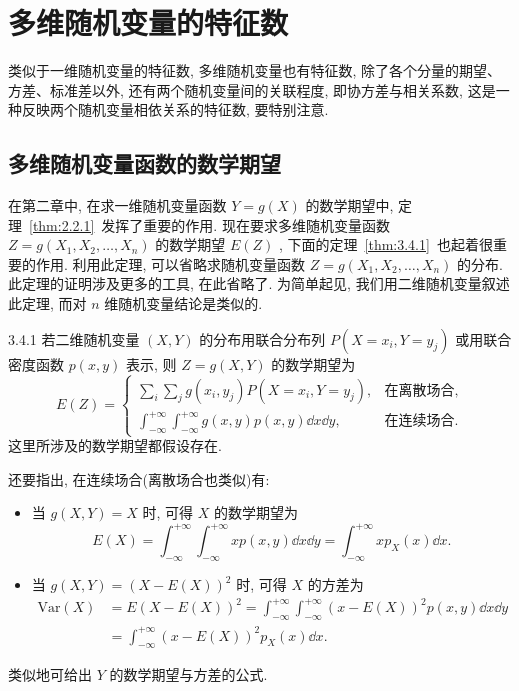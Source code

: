   \section{多维随机变量的特征数}\label{sec:3.4}
  类似于一维随机变量的特征数, 多维随机变量也有特征数, 除了各个分量的期望、方差、标准差以外, 还有两个随机变量间的关联程度, 即协方差与相关系数, 这是一种反映两个随机变量相依关系的特征数, 要特别注意.
  \subsection{多维随机变量函数的数学期望}\label{ssec:3.4.1}
  在第二章中, 在求一维随机变量函数 $Y=g(X)$ 的数学期望中, 定理~\ref{thm:2.2.1}~发挥了重要的作用. 现在要求多维随机变量函数 $Z=g(X_1,X_2,\ldots,X_n)$ 的数学期望 $E(Z)$ , 下面的定理~\ref{thm:3.4.1}~也起着很重要的作用. 利用此定理, 可以省略求随机变量函数 $Z=g(X_1,X_2,\ldots,X_n)$ 的分布. 此定理的证明涉及更多的工具, 在此省略了. 为简单起见, 我们用二维随机变量叙述此定理, 而对 $n$ 维随机变量结论是类似的.
  \begin{theorem}{}{3.4.1}
  	若二维随机变量 $(X,Y)$ 的分布用联合分布列 $P(X=x_i,Y=y_j)$ 或用联合密度函数 $p(x,y)$ 表示, 则 $Z=g(X,Y)$ 的数学期望为
  	\begin{equation}\label{eq:3.4.1}
  		E(Z)=\begin{cases}
  		\sum_{i}\sum_{j}g(x_i,y_j)P(X=x_i,Y=y_j), & \text{在离散场合},\\
  		\int_{-\infty}^{+\infty}\int_{-\infty}^{+\infty}g(x,y)p(x,y)\dd x\dd y, & \text{在连续场合}.
  		\end{cases}
  	\end{equation}
  	这里所涉及的数学期望都假设存在.
  	
  	还要指出, 在连续场合(离散场合也类似)有:
  	\begin{itemize}
  		\item 当 $g(X,Y)=X$ 时, 可得 $X$ 的数学期望为
  		\begin{equation*}
  			E(X)=\int_{-\infty}^{+\infty}\int_{-\infty}^{+\infty}xp(x,y)\dd x\dd y=\int_{-\infty}^{+\infty}xp_{X}(x)\dd x.
  		\end{equation*}
  		\item 当 $g(X,Y)=(X-E(X))^2$ 时, 可得 $X$ 的方差为
  		\begin{align*}
  			\mathrm{Var}(X)&=E(X-E(X))^2=\int_{-\infty}^{+\infty}\int_{-\infty}^{+\infty}(x-E(X))^2p(x,y)\dd x\dd y\\
  			&=\int_{-\infty}^{+\infty}(x-E(X))^2p_{X}(x)\dd x.
  		\end{align*}
  	\end{itemize}
  
    类似地可给出 $Y$ 的数学期望与方差的公式.
  \end{theorem}
